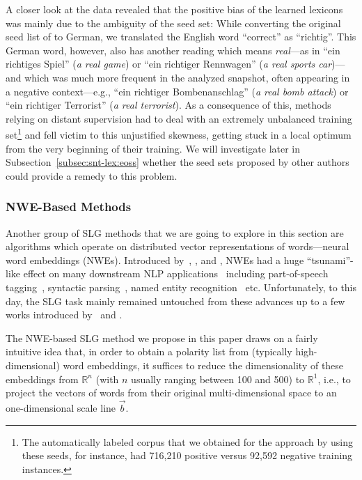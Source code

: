 A closer look at the data revealed that the positive bias of the
learned lexicons was mainly due to the ambiguity of the seed set:
While converting the original seed list of \citet{Turney:03} to
German, we translated the English word ``correct'' as ``richtig''.
This German word, however, also has another reading which means
\emph{real}---as in ``ein richtiges Spiel'' (\emph{a real game}) or
``ein richtiger Rennwagen'' (\emph{a real sports car})---and which was
much more frequent in the analyzed snapshot, often appearing in a
negative context---e.g., ``ein richtiger Bombenanschlag'' (\emph{a
  real bomb attack}) or ``ein richtiger Terrorist'' (\emph{a real
  terrorist}).  As a consequence of this, methods relying on distant
supervision had to deal with an extremely unbalanced training
set\footnote{The automatically labeled corpus that we obtained for the
  approach by \citet{Kiritchenko:14} using these seeds, for instance,
  had 716,210 positive versus 92,592 negative training instances.} and
fell victim to this unjustified skewness, getting stuck in a local
optimum from the very beginning of their training.  We will
investigate later in Subsection~\ref{subsec:snt-lex:eoss} whether the
seed sets proposed by other authors could provide a remedy to this
problem.

\subsubsection{NWE-Based Methods}

Another group of SLG methods that we are going to explore in this
section are algorithms which operate on distributed vector
representations of words---neural word embeddings (NWEs).  Introduced
by~\citet{Bengio:03}, \citet{Collobert:11}, and \citet{Mikolov:13},
NWEs had a huge ``tsunami''-like effect on many downstream NLP
applications~\cite{Manning:15} including part-of-speech
tagging~\cite{Collobert:11}, syntactic
parsing~\cite{Kiperwasser:16b,Kiperwasser:16a}, named entity
recognition~\cite{dosSantos:15} etc.  Unfortunately, to this day, the
SLG task mainly remained untouched from these advances up to a few
works introduced by~\citet{Tang:14} and \citet{Vo:16}.

The NWE-based SLG method we propose in this paper draws on a fairly
intuitive idea that, in order to obtain a polarity list from
(typically high-dimensional) word embeddings, it suffices to reduce
the dimensionality of these embeddings from $\mathbb{R}^n$ (with $n$
usually ranging between 100 and 500) to $\mathbb{R}^1$, i.e., to
project the vectors of words from their original multi-dimensional
space to an one-dimensional scale line $\vec{b}$.

